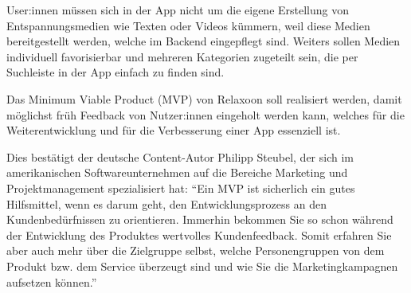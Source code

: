 User:innen müssen sich in der App nicht um die eigene Erstellung von Entspannungsmedien wie Texten oder Videos
kümmern, weil diese Medien bereitgestellt werden, welche im Backend eingepflegt sind. Weiters sollen Medien
individuell favorisierbar und mehreren Kategorien zugeteilt sein, die per Suchleiste in der App einfach zu
finden sind.

Das Minimum Viable Product (MVP) von Relaxoon soll realisiert werden, damit möglichst früh Feedback von Nutzer:innen
eingeholt werden kann, welches für die Weiterentwicklung und für die Verbesserung einer App essenziell ist.

Dies bestätigt der deutsche Content-Autor Philipp Steubel, der sich im amerikanischen Softwareunternehmen auf 
die Bereiche Marketing und 
Projektmanagement spezialisiert hat: "`Ein MVP ist sicherlich ein gutes Hilfsmittel, wenn es darum geht, den 
Entwicklungsprozess an den Kundenbedürfnissen zu orientieren. Immerhin bekommen Sie so schon während der 
Entwicklung des Produktes wertvolles Kundenfeedback. Somit erfahren Sie aber auch mehr über die Zielgruppe 
selbst, welche Personengruppen von dem Produkt bzw. dem Service überzeugt sind und wie Sie die Marketingkampagnen
aufsetzen können."' \cite{mvp}